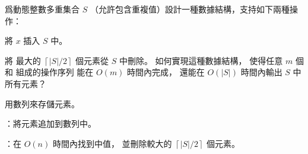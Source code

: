 \startEXERCISE
爲動態整數多重集合 $S$ （允許包含重複值）設計一種數據結構，支持如下兩種操作：
\startigBase[2]
\item {} 將 $x$ 插入 $S$ 中。
\item {} 將
最大的 $\left\lceil |S|/2 \right\rceil$ 個元素從 $S$ 中刪除。
\stopigBase
如何實現這種數據結構，
使得任意 $m$ 個  和  組成的操作序列
能在 $O(m)$ 時間內完成，
還能在 $O(|S|)$ 時間內輸出 $S$ 中所有元素？
\stopEXERCISE

\startANSWER
用數列來存儲元素。

：將元素追加到數列中。

：在 $O(n)$ 時間內找到中值，
並刪除較大的 $\left\lceil |S|/2 \right\rceil$ 個元素。
\stopANSWER
